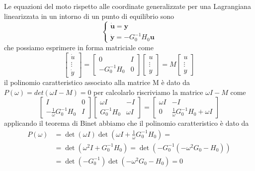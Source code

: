 Le equazioni del moto rispetto alle coordinate generalizzate per una Lagrangiana linearizzata in un intorno di un punto di equilibrio sono
\begin{equation}
\left\{\begin{array}{l}
	\dot{\bm{u}}=\bm{y} \\
	\dot{\bm{y}}=-G_0^{-1} H_0 \bm{u}
\end{array}\right.
\end{equation}
che possiamo esprimere in forma matriciale come 
\begin{equation}
\left[\begin{array}{l}
\dot{u} \\
\vdots \\
\dot{y}
\end{array}\right]=\left[\begin{array}{c|c}
0 & I \\
\hline -G_0^{-1} H_0 & 0
\end{array}\right]
\left[\begin{array}{c}
u\\
\vdots \\
y
\end{array}\right] = M
\left[\begin{array}{c}
u\\
\vdots \\
y
\end{array}\right]
\end{equation}
il polinomio caratteristico associato alla matrice M \`{e} dato da $P(\omega) = det (\omega I -M) = 0$ per calcolarlo riscriviamo la matrice $\omega I - M$ come 
\begin{equation}
\left[\begin{array}{c|c}
I & 0 \\
\hline -\frac{1}{\omega}G_0^{-1} H_0 & I
\end{array}\right]\left[\begin{array}{c|c}
\omega I & -I \\
\hline G_0^{-1} H_0 & \omega I
\end{array}\right]=\left[\begin{array}{c|c}
\omega I & -I \\
\hline 0 & \frac{1}{\omega} G_0^{-1} H_0+\omega I
\end{array}\right]
\end{equation}
applicando il teorema di Binet abbiamo che il polinomio caratteristico \`{e} dato da 
\begin{equation}
\begin{aligned}
P(\omega) & =\operatorname{det}(\omega I) \operatorname{det}\left(\omega I+\frac{1}{\omega} G_0^{-1} H_0\right)= \\
& =\operatorname{det}\left(\omega^2 I+G_0^{-1} H_0\right)=\operatorname{det}\left(-G_0^{-1}\left(-\omega^2 G_0-H_0\right)\right) \\
& =\operatorname{det}\left(-G_0^{-1}\right) \operatorname{det}\left(-\omega^2 G_0-H_0\right)= 0
\end{aligned}
\end{equation}
